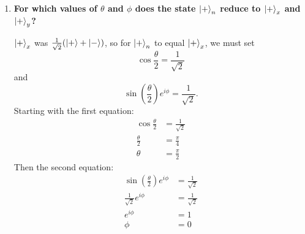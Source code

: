 \documentclass[11pt]{article}
\begin{document}
\begin{enumerate}[label=\textbf{\arabic*.}, start=2]
{\begin{enumerate}[label=\textbf{(\alph*)}]
{\begin{align*}
                    \end{align*}
                    If \(\ket{+}_n=a\ket{+}+b\ket{-}\), then the above matrix corresponds to the equation
                    \begin{align*}
                        (\cos\theta-1)a+\sin(\theta)e^{-i\phi}b&=0 \\
                        (1-\cos\theta)a&=\sin(\theta)e^{-i\phi}b \\
                        \sin^2\left(\tfrac \theta 2 \right)a&=\frac 1 2 \sin(\theta)e^{-i\phi}b \\
                        \sin^2\left(\tfrac \theta 2 \right)e^{i\phi}a&=\sin(\theta)\cos^2\left(\tfrac \theta 2 \right)b
                    \end{align*}
                    So \(\ket{+}_n=\sin^2\left(\tfrac \theta 2 \right)e^{i\phi}\ket{+}+\sin(\theta)\cos^2\left(\tfrac \theta 2 \right)\ket{-}\).
                    \par
                    \textit{(I couldn't get the equation to match the form above.)}
                }
                \item{
                    \textbf{\boldmath For which values of \(\theta\) and \(\phi\) does the state \(\ket{+}_n\) reduce to \(\ket{+}_x\) and \(\ket{+}_y\)?}
                    \par
                    \(\ket{+}_x\) was \(\frac{1}{\sqrt 2}(\ket{+}+\ket{-})\), so for \(\ket{+}_n\) to equal \(\ket{+}_x\), we must set \[\cos\frac \theta 2=\frac{1}{\sqrt 2}\] and \[\sin\left(\frac \theta 2\right)e^{i\phi}=\frac{1}{\sqrt 2}.\] Starting with the first equation:
                    \begin{align*}
                        \cos\frac \theta 2&=\frac{1}{\sqrt 2} \\
                        \frac \theta 2&=\frac \pi 4 \\
                        \theta&=\frac \pi 2
                    \end{align*}
                    Then the second equation:
                    \begin{align*}
                        \sin\left(\frac \theta 2\right)e^{i\phi}&=\frac{1}{\sqrt 2} \\
                        \frac{1}{\sqrt 2}e^{i\phi}&=\frac{1}{\sqrt 2} \\
                        e^{i\phi}&=1 \\
                        \phi&=0
                    \end{align*}
}
\end{enumerate}}
\end{enumerate}
\end{document}
